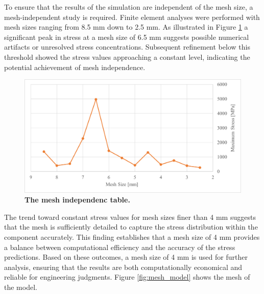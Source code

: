 To ensure that the results of the simulation are independent of the mesh size, a mesh-independent study is required. 
Finite element analyses were performed with mesh sizes ranging from 8.5 mm down to 2.5 mm. As illustrated in 
Figure \ref{fig:mesh_indep} a significant peak in stress at a mesh size of 6.5 mm suggests possible numerical artifacts or 
unresolved stress concentrations. Subsequent refinement below this threshold showed the stress values approaching 
a constant level, indicating the potential achievement of mesh independence.
\begin{figure}[H] %
    \centering
    \captionsetup{labelsep=colon}
    \includegraphics[width=1.0\textwidth]{Image/Design/mesh_independence.png} 
    \caption[The mesh independence table]
    {\centering \textbf{The mesh independenc table.}}
    \label{fig:mesh_indep}
\end{figure}
The trend toward constant stress values for mesh sizes finer than 4 mm suggests that the mesh is sufficiently 
detailed to capture the stress distribution within the component accurately. This finding establishes that a 
mesh size of 4 mm provides a balance between computational efficiency and the accuracy of the stress predictions. 
Based on these outcomes, a mesh size of 4 mm is used for further analysis, ensuring that the results are both 
computationally economical and reliable for engineering judgments. Figure \ref{fig:mesh_model} shows the mesh 
of the model.
